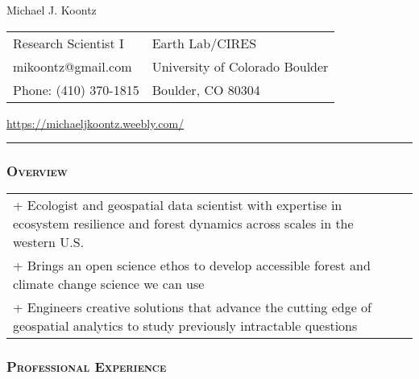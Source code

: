 \documentclass[10pt,english]{article}
\providecommand{\tabularnewline}{\\}
\begin{document}
\begin {center}
{\huge Michael J. Koontz}\tabularnewline
\vspace{1em}

\begin{tabularx}{\textwidth}{@{}>{\raggedright}X >{\raggedleft}X@{}}
Research Scientist I & Earth Lab/CIRES \tabularnewline
mikoontz@gmail.com & University of Colorado Boulder \tabularnewline
Phone: (410) 370-1815 & Boulder, CO 80304 
\end{tabularx}

\url{https://michaeljkoontz.weebly.com/}
\end{center}
\vspace{-1.5em}

\rule[0.5ex]{1\linewidth}{0.5pt} 


\subsubsection*{\textsc{Overview}}
\vspace{-0.5ex}

\renewcommand{\arraystretch}{1.2}
\begin{tabularx}{\textwidth}{@{}>{\raggedright}p{6.25in} >{\raggedleft}X@{}}
+ Ecologist and geospatial data scientist with expertise in ecosystem resilience and forest dynamics across scales in the western U.S. &  \tabularnewline
+ Brings an open science ethos to develop accessible forest and climate change science we can use &  \tabularnewline
+ Engineers creative solutions that advance the cutting edge of geospatial analytics to study previously intractable questions &  \tabularnewline
\end{tabularx}


\subsubsection*{\textsc{Professional Experience}}
\vspace{-0.5ex}
\end{document}
